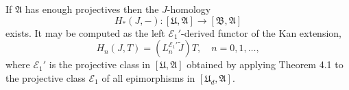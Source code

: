 If $\mathfrak{A}$ has enough projectives then the $J$-homology
$$H_*(J, -) : [\mathfrak{U}, \mathfrak{A}] \rightarrow [\mathfrak{B}, \mathfrak{A}]$$
exists. It may be computed as the left $\mathcal{E}_1'$-derived functor of the Kan extension,
$$H_n(J, T) = (L_n^{\mathcal{E}_1'} \tilde{J}) T, \quad n = 0, 1, \dots,$$
where $\mathcal{E}_1'$ is the projective class in $[\mathfrak{U}, \mathfrak{A}]$ obtained by applying Theorem 4.1 to the projective class $\mathcal{E}_1$ of all epimorphisms in $[\mathfrak{U}_d, \mathfrak{A}]$.
